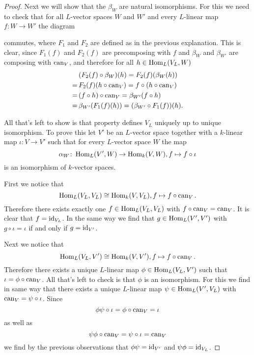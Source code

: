 \begin{proof}
 Next we will show that the $\beta_W$ are natural isomorphisms. For this we need to check that for all $L$-vector spaces $W$ and $W'$ and every $L$-linear map \mbox{$f \colon W \to W'$} the diagram
 \begin{center}
 \end{center}
 commutes, where $F_1$ and $F_2$ are defined as in the previous explanation. This is clear, since $F_1(f)$ and $F_2(f)$ are precomposing with $f$ and $\beta_W$ and $\beta_{W'}$ are composing with $\operatorname{can}_V$, and therefore for all $h \in \operatorname{Hom}_L(V_L, W)$
 \begin{align*}
   &\, (F_2(f) \circ \beta_W)(h)
  =    F_2(f)(\beta_W(h)) \\
  =&\, F_2(f)(h \circ \operatorname{can}_V)
  =    f \circ (h \circ \operatorname{can}_V) \\
  =&\, (f \circ h) \circ \operatorname{can}_V
  =    \beta_{W'}(f \circ h) \\
  =&\, \beta_{W'}(F_1(f)(h))
  =    (\beta_{W'} \circ F_1(f))(h).
 \end{align*}
 
 All that’s left to show is that property defines $V_L$ uniquely up to unique isomorphism. To prove this let $V'$ be an $L$-vector space together with a $k$-linear map $\iota \colon V \to V'$ such that for every $L$-vector space $W$ the map
 \[
  \alpha_W \colon \operatorname{Hom}_L(V', W) \to \operatorname{Hom}_k(V, W), f \mapsto f \circ \iota
 \]
 is an isomorphism of $k$-vector spaces.
 
 First we notice that
 \[
  \operatorname{Hom}_L(V_L, V_L) \cong \operatorname{Hom}_k(V, V_L), f \mapsto f \circ \operatorname{can}_V.
 \]
 Therefore there exists exactly one $f \in \operatorname{Hom}_L(V_L, V_L)$ with $f \circ \operatorname{can}_V = \operatorname{can}_V$. It is clear that $f = \operatorname{id}_{V_L}$. In the same way we find that $g \in \operatorname{Hom}_L(V', V')$ with $g \circ \iota = \iota$ if and only if $g = \operatorname{id}_{V'}$.
 
 Next we notice that
 \[
  \operatorname{Hom}_L(V_L, V') \cong \operatorname{Hom}_k(V, V'), f \mapsto f \circ \operatorname{can}_V.
 \]
 Therefore there exists a unique $L$-linear map $\phi \in \operatorname{Hom}_L(V_L, V')$ such that \mbox{$\iota = \phi \circ \operatorname{can}_V$}. All that’s left to check is that $\phi$ is an isomorphism. For this we find in same way that there exists a unique $L$-linear map $\psi \in \operatorname{Hom}_L(V', V_L)$ with $\operatorname{can}_V = \psi \circ \iota$. Since
 \[
  \phi \psi \circ \iota = \phi \circ \operatorname{can}_V = \iota
 \]
 as well as
 \[
  \psi \phi \circ \operatorname{can}_V= \psi \circ \iota = \operatorname{can}_V
 \]
 we find by the previous observations that $\phi \psi = \operatorname{id}_{V'}$ and $\psi \phi = \operatorname{id}_{V_L}$.
\end{proof}


